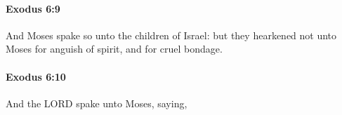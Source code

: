 		\paragraph{Exodus 6:9} %
			\label{EXODUS-6-9}

			And Moses spake so unto the children of Israel: but they hearkened not unto Moses for anguish of spirit, and for cruel bondage.


		\paragraph{Exodus 6:10} %
			\label{EXODUS-6-10}

			And the LORD spake unto Moses, saying,


